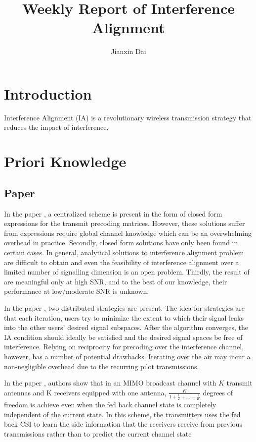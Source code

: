 \documentclass[12pt, onecolumn]{IEEEtran}
\author{Jianxin Dai\\
}
\title{Weekly Report of Interference Alignment }
\begin{document}
\maketitle

\section{Introduction}
Interference Alignment (IA) is a revolutionary wireless transmission strategy that reduces the impact of interference.

\section{Priori Knowledge}
\subsection{Paper}
In the paper \cite{cadambe2008interference}, a centralized scheme is present in the form of closed form expressions for the transmit precoding matrices. However, these solutions suffer from expressions require global channel knowledge which can be an  overwhelming overhead in practice. Secondly, closed form solutions have only been found in certain cases. In general, analytical solutions to interference alignment problem are difficult to obtain and even the feasibility of interference alignment over  a limited number of signalling dimension is an open problem. Thirdly, the result of \cite{cadambe2008interference} are meaningful only at high SNR, and to the best of  our knowledge, their performance  at low/moderate SNR is unknown.


In the paper \cite{gomadam2011distributed}, two  distributed strategies are present. The idea for strategies are  that each iteration, users try to minimize the extent to which their signal leaks into the other users' desired signal subspaces. After the algorithm converges, the IA condition should ideally be satisfied and the desired signal spaces be free of interference.   Relying on reciprocity for precoding over the interference channel, however, has a number of potential drawbacks. Iterating over the air may incur a non-negligible overhead due to the recurring pilot transmissions.

In the paper \cite{maddah2012completely}, authors show that in an MIMO broadcast channel with $K$ transmit antennas and K receivers equipped  with one antenna, $\frac{K}{1+ \frac{1}{2}+...+\frac{1}{K}}$ degrees of freedom is achieve even when the fed back channel state is completely independent of the current state. In this scheme, the transmitters uses the fed back CSI to learn the side information that the receivers receive from previous transmissions rather than to predict the current channel state
\end{document}
